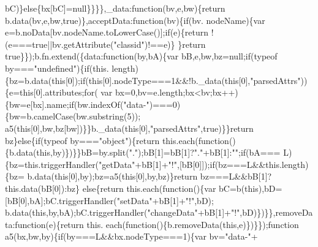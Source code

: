 \begin{DoxyCode}
      bC)\}\textcolor{keywordflow}{else}\{bx[bC]=null\}\}\}\},\_data:\textcolor{keyword}{function}(bv,e,bw)\{\textcolor{keywordflow}{return} b.data(bv,e,bw,\textcolor{keyword}{true})\},acceptData:\textcolor{keyword}{function}(bv)\{\textcolor{keywordflow}{if}(bv.
      nodeName)\{var e=b.noData[bv.nodeName.toLowerCase()];\textcolor{keywordflow}{if}(e)\{\textcolor{keywordflow}{return} !(e===\textcolor{keyword}{true}||bv.getAttribute(\textcolor{stringliteral}{"classid"})!==e)\}
      \}\textcolor{keywordflow}{return} \textcolor{keyword}{true}\}\});b.fn.extend(\{data:\textcolor{keyword}{function}(by,bA)\{var bB,e,bw,bz=null;\textcolor{keywordflow}{if}(typeof by===\textcolor{stringliteral}{"undefined"})\{\textcolor{keywordflow}{if}(this.
      length)\{bz=b.data(\textcolor{keyword}{this}[0]);\textcolor{keywordflow}{if}(\textcolor{keyword}{this}[0].nodeType===1&&!b.\_data(\textcolor{keyword}{this}[0],\textcolor{stringliteral}{"parsedAttrs"}))\{e=\textcolor{keyword}{this}[0].attributes;\textcolor{keywordflow}{for}(
      var bx=0,bv=e.length;bx<bv;bx++)\{bw=e[bx].name;\textcolor{keywordflow}{if}(bw.indexOf(\textcolor{stringliteral}{"data-"})===0)\{bw=b.camelCase(bw.substring(5));
      a5(\textcolor{keyword}{this}[0],bw,bz[bw])\}\}b.\_data(\textcolor{keyword}{this}[0],\textcolor{stringliteral}{"parsedAttrs"},\textcolor{keyword}{true})\}\}\textcolor{keywordflow}{return} bz\}\textcolor{keywordflow}{else}\{\textcolor{keywordflow}{if}(typeof by===\textcolor{stringliteral}{"object"})\{\textcolor{keywordflow}{return} 
      this.each(\textcolor{keyword}{function}()\{b.data(\textcolor{keyword}{this},by)\})\}\}bB=by.split(\textcolor{stringliteral}{"."});bB[1]=bB[1]?\textcolor{stringliteral}{"."}+bB[1]:\textcolor{stringliteral}{""};\textcolor{keywordflow}{if}(bA===
      L)\{bz=this.triggerHandler(\textcolor{stringliteral}{"getData"}+bB[1]+\textcolor{stringliteral}{"!"},[bB[0]]);\textcolor{keywordflow}{if}(bz===L&&this.length)\{bz=
      b.data(\textcolor{keyword}{this}[0],by);bz=a5(\textcolor{keyword}{this}[0],by,bz)\}\textcolor{keywordflow}{return} bz===L&&bB[1]?this.data(bB[0]):bz\}
      else\{\textcolor{keywordflow}{return} this.each(\textcolor{keyword}{function}()\{var bC=b(\textcolor{keyword}{this}),bD=[bB[0],bA];bC.triggerHandler(\textcolor{stringliteral}{"setData"}+bB[1]+\textcolor{stringliteral}{"!"},bD);
      b.data(\textcolor{keyword}{this},by,bA);bC.triggerHandler(\textcolor{stringliteral}{"changeData"}+bB[1]+\textcolor{stringliteral}{"!"},bD)\})\}\},removeData:\textcolor{keyword}{function}(e)\{\textcolor{keywordflow}{return} this.
      each(\textcolor{keyword}{function}()\{b.removeData(\textcolor{keyword}{this},e)\})\}\});\textcolor{keyword}{function} a5(bx,bw,by)\{\textcolor{keywordflow}{if}(by===L&&bx.nodeType===1)\{var bv=\textcolor{stringliteral}{"data-"}+

\end{DoxyCode}

